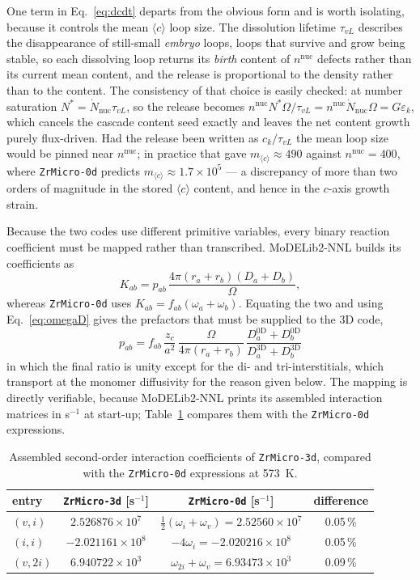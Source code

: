 \documentclass{article}
\newcommand{\cloop}{\ensuremath{\langle c\rangle}}
\newcommand{\ZrM}{\texttt{ZrMicro-3d}}
\newcommand{\MoD}{\textsf{MoDELib2-NNL}}
\newcommand{\ZrOd}{\texttt{ZrMicro-0d}}
\begin{document}
One term in Eq.~\eqref{eq:dcdt} departs from the obvious form and is worth
isolating, because it controls the mean \cloop{} loop size. The dissolution
lifetime $\tau_{vL}$ describes the disappearance of still-small \emph{embryo}
loops, loops that survive and grow being stable, so each dissolving loop returns
its \emph{birth} content of $n^{\text{nuc}}$ defects rather than its current mean
content, and the release is proportional to the density rather than to the
content. The consistency of that choice is easily checked: at number saturation
$N^\ast=\dot N_{\text{nuc}}\tau_{vL}$, so the release becomes
$n^{\text{nuc}}N^\ast\Omega/\tau_{vL}=n^{\text{nuc}}\dot N_{\text{nuc}}\Omega
=G\varepsilon_k$, which cancels the cascade content seed exactly and leaves the net
content growth purely flux-driven. Had the release been written as $c_k/\tau_{vL}$
the mean loop size would be pinned near $n^{\text{nuc}}$; in practice that gave
$m_{\cloop}\approx490$ against $n^{\text{nuc}}=400$, where {\ZrOd} predicts
$m_{\cloop}\approx1.7\times10^{5}$ --- a discrepancy of more than two orders of
magnitude in the stored \cloop{} content, and hence in the $c$-axis growth strain.

Because the two codes use different primitive variables, every binary reaction
coefficient must be mapped rather than transcribed. {\MoD} builds its coefficients
as
\begin{equation}
K_{ab} = p_{ab}\,\frac{4\pi (r_a + r_b)(D_a + D_b)}{\Omega},
\label{eq:K3d}
\end{equation}
whereas {\ZrOd} uses $K_{ab}=f_{ab}(\omega_a+\omega_b)$. Equating the two and using
Eq.~\eqref{eq:omegaD} gives the prefactors that must be supplied to the $3$D code,
\begin{equation}
\boxed{\;
p_{ab} = f_{ab}\,\frac{z_c}{a^2}\,\frac{\Omega}{4\pi (r_a+r_b)}\,
\frac{D^{\text{0D}}_a + D^{\text{0D}}_b}{D^{\text{3D}}_a + D^{\text{3D}}_b}\;}
\label{eq:prefactor}
\end{equation}
in which the final ratio is unity except for the di- and tri-interstitials, which
transport at the monomer diffusivity for the reason given below. The mapping is
directly verifiable, because {\MoD} prints its assembled interaction matrices in
s$^{-1}$ at start-up; Table~\ref{tab:reactions} compares them with the {\ZrOd}
expressions.

\begin{table}[htbp]
\centering
\caption{Assembled second-order interaction coefficients of {\ZrM}, compared with
the {\ZrOd} expressions at 573~K.}
\label{tab:reactions}
\begin{tabular}{@{}lccc@{}}
\toprule
entry & \ZrM{} [s$^{-1}$] & \ZrOd{} [s$^{-1}$] & difference \\
\midrule
$(v,i)$   & $2.526876\times 10^{7}$  & $\tfrac12(\omega_i+\omega_v) = 2.52560\times 10^{7}$ & 0.05\,\% \\
$(i,i)$   & $-2.021161\times 10^{8}$ & $-4\omega_i = -2.020216\times 10^{8}$                & 0.05\,\% \\
$(v,2i)$  & $6.940722\times 10^{3}$  & $\omega_{2i}+\omega_v = 6.93473\times 10^{3}$        & 0.09\,\% \\
\bottomrule
\end{tabular}
\end{table}
\end{document}
